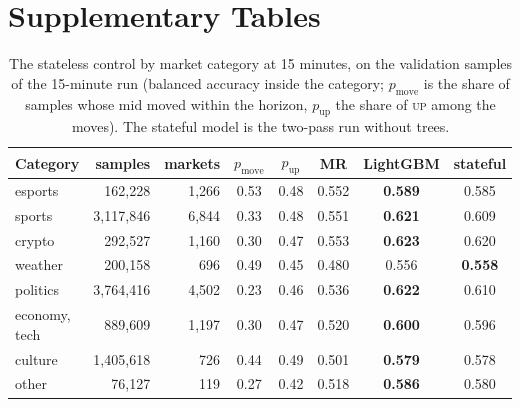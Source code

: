\chapter{Supplementary Tables}
\label{app:tables}

\begin{table}[h]
\centering
\caption{The stateless control by market category at 15 minutes, on the validation
samples of the 15-minute run (balanced accuracy inside the category; $p_{\mathrm{move}}$ is
the share of samples whose mid moved within the horizon, $p_{\mathrm{up}}$ the share of
\textsc{up} among the moves).  The stateful model is the two-pass run without trees.}
\label{tab:app:cat15}
\small
\begin{fittable}\begin{tabular}{lrrccccc}
\toprule
Category & samples & markets & $p_{\mathrm{move}}$ & $p_{\mathrm{up}}$ & MR & LightGBM & stateful \\
\midrule
esports       & 162{,}228   & 1{,}266 & 0.53 & 0.48 & 0.552 & \textbf{0.589} & 0.585 \\
sports        & 3{,}117{,}846 & 6{,}844 & 0.33 & 0.48 & 0.551 & \textbf{0.621} & 0.609 \\
crypto        & 292{,}527   & 1{,}160 & 0.30 & 0.47 & 0.553 & \textbf{0.623} & 0.620 \\
weather       & 200{,}158   &   696   & 0.49 & 0.45 & 0.480 & 0.556 & \textbf{0.558} \\
politics      & 3{,}764{,}416 & 4{,}502 & 0.23 & 0.46 & 0.536 & \textbf{0.622} & 0.610 \\
economy, tech & 889{,}609   & 1{,}197 & 0.30 & 0.47 & 0.520 & \textbf{0.600} & 0.596 \\
culture       & 1{,}405{,}618 &   726   & 0.44 & 0.49 & 0.501 & \textbf{0.579} & 0.578 \\
other         & 76{,}127    &   119   & 0.27 & 0.42 & 0.518 & \textbf{0.586} & 0.580 \\
\bottomrule
\end{tabular}\end{fittable}
\end{table}


